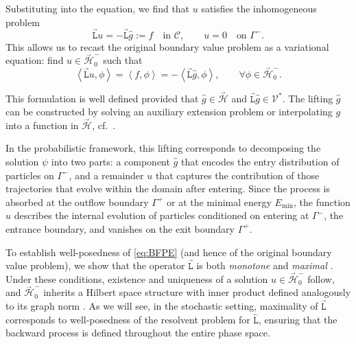 \documentclass{amsart}
\newcommand{\fL}{\stackrel{_\rightarrow}{\mathtt L}}
\newcommand{\bL}{\stackrel{_\leftarrow}{\mathtt L}}
\theoremstyle{plain}
\newcommand{\ltwop}[2]{\ensuremath{\!\left\langle{#1,#2}\right\rangle}}
\newcommand{\cH}{\stackrel{_\rightarrow}{\mathscr H}}
\newcommand{\cV}{\ensuremath{\mathscr V}}
\begin{document}
Substituting into the equation, we find that $u$ satisfies the
inhomogeneous problem
\begin{equation}\label{eq:extension_of_g_problem}
  \fL u = -\fL \widehat g
  :=
  f \quad \text{in } \mathcal{C}, \qquad u = 0 \quad \text{on } \Gamma^-.
\end{equation}
This allows us to recast the original boundary value problem as a
variational equation: find $u \in \cH_0^-$ such that
\begin{equation}
  \ltwop{\fL u}{\phi} = \ltwop{f}{\phi} = -\ltwop{\fL \widehat g}{\phi}, \qquad \forall \phi \in \cH_0^-.
  \label{eq:BFPE-lifted}
\end{equation}

This formulation is well defined provided that $\widehat g \in \cH$ and
$\fL \widehat g \in \cV^*$. The lifting $\widehat g$ can be constructed
by solving an auxiliary extension problem or interpolating $g$ into a
function in $\cH$, cf.~\cite[Section~5.4]{Evans:1998}.

In the probabilistic framework, this lifting corresponds to
decomposing the solution $\psi$ into two parts: a component $\widehat
g$ that encodes the entry distribution of particles on $\Gamma^-$, and
a remainder $u$ that captures the contribution of those trajectories
that evolve within the domain after entering. Since the process is
absorbed at the outflow boundary $\Gamma^+$ or at the minimal energy
$E_{\min}$, the function $u$ describes the internal evolution of
particles conditioned on entering at {$\Gamma^-$}, the entrance
boundary, and vanishes on the {exit boundary $\Gamma^+$}.

To establish well-posedness of \eqref{eq:BFPE} (and hence of the
original boundary value problem), we show that the operator $\fL$ is
both \emph{monotone} and \emph{maximal}
\cite[§7.1]{brezis2011functional}. Under these conditions, existence
and uniqueness of a solution $u \in \cH_0^-$ follow, and $\cH_0^-$
inherits a Hilbert space structure with inner product defined
analogously to its graph norm \cite[Section~6.3]{Ern_Guermond_1}. As
we will see, in the stochastic setting, maximality of $\fL$
corresponds to well-posedness of the resolvent problem for $\bL$,
ensuring that the backward process is defined throughout the entire
phase space.
\end{document}
